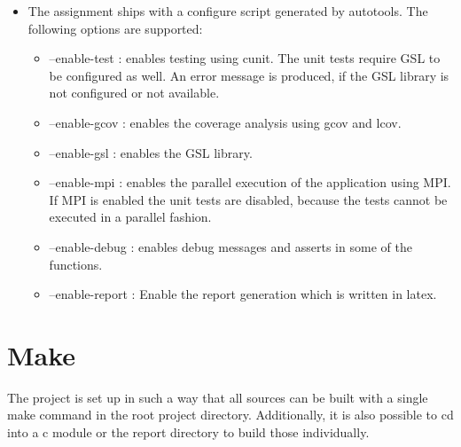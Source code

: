 \documentclass[12pt,a4paper]{report}
\begin{document}
\begin{itemize}
\item The assignment ships with a configure script generated by
  autotools. The following options are supported:
  \begin{itemize}
  \item --enable-test : enables testing using cunit. The unit tests
    require GSL to be configured as well. An error message is
    produced, if the GSL library is not configured or not available.
  \item --enable-gcov : enables the coverage analysis using gcov and
    lcov.
  \item --enable-gsl : enables the GSL library.
  \item --enable-mpi : enables the parallel execution of the
    application using MPI. If MPI is enabled the unit tests are
    disabled, because the tests cannot be executed in a parallel fashion.
  \item --enable-debug : enables debug messages and asserts in some of
    the functions.
  \item --enable-report : Enable the report generation which is
    written in latex.
  \end{itemize}
\end{itemize}

\section{Make}
\label{sec:make}

The project is set up in such a way that all sources can be built with
a single make command in the root project directory. Additionally, it
is also possible to cd into a c module or the report directory to
build those individually.
\end{document}
